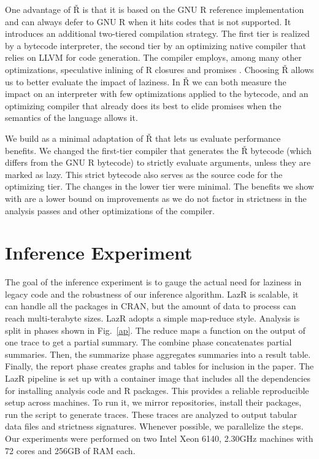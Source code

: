 \documentclass[review,screen,acmsmall]{acmart}
\newcommand{\lazr}{{\sf LazR}\xspace}
\renewcommand{\Rsh}{{\sf\v R}\xspace}
\begin{document}
One advantage of \Rsh is that it is based on the GNU R reference implementation
and can always defer to GNU R when it hits codes that is not supported. It
introduces an additional two-tiered compilation strategy. The first tier is
realized by a bytecode interpreter, the second tier by an optimizing native
compiler that relies on LLVM for code generation. The compiler employs, among
many other optimizations, speculative inlining of R closures and promises
\citep{dls19, oopsla20c}.
Choosing \Rsh allows us to better evaluate the impact
of laziness. In \Rsh we can both measure the impact on an interpreter with few
optimizations applied to the bytecode, and an optimizing compiler that already
does its best to elide promises when the semantics of the language allows it.

We build \rshstrict as a minimal adaptation of \Rsh that lets us evaluate
performance benefits. We changed the first-tier compiler that generates the \Rsh
bytecode (which differs from the GNU R bytecode) to strictly evaluate arguments,
unless they are marked as lazy. This strict bytecode also serves as the source
code for the optimizing tier. The changes in the lower tier were minimal. The
benefits we show with \rshstrict are a lower bound on improvements as we do not
factor in strictness in the analysis passes and other optimizations of the
compiler.

\section{Inference Experiment}

The goal of the inference experiment is to gauge the actual need for
laziness in legacy code and the robustness of our inference algorithm.
\lazr is scalable, it can handle all the packages in CRAN, but the amount of
data to process can reach multi-terabyte sizes. \lazr adopts a simple map-reduce
style. Analysis is split in phases shown in Fig.~\ref{ap}. The reduce maps a
function on the output of one trace to get a partial summary. The combine phase
concatenates partial summaries. Then, the summarize phase aggregates summaries
into a result table. Finally, the report phase creates graphs and tables for
inclusion in the paper. The \lazr pipeline is set up with a container image that
includes all the dependencies for installing analysis code and R packages. This
provides a reliable reproducible setup across machines. To run it, we mirror
repositories, install their packages, run the script to generate traces.
These
traces are analyzed to output tabular data files and strictness signatures.
Whenever possible, we parallelize the steps. Our experiments were performed on
two Intel Xeon 6140, 2.30GHz machines with 72 cores and 256GB of RAM each.
\end{document}
